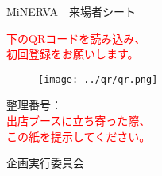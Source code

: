 \documentclass[a4paper,14pt]{jsarticle}
\begin{document}
\begin{center}
    {\Huge	MiNERVA　来場者シート}

    \textcolor{red}{
        {\LARGE
                下のQRコードを読み込み、\\初回登録をお願いします。
            }
    }

    \begin{figure}[h]
        \centering
        \texttt{[image: ../qr/qr.png]}
        \label{fig:qr}
    \end{figure}

    {\huge
    整理番号：
    \\
    }
    \textcolor{red}{
        {\LARGE
        出店ブースに立ち寄った際、\\この紙を提示してください。
    }
    }

\end{center}

\begin{flushright}
    {\LARGE
    企画実行委員会
    }
\end{flushright}
\end{document}

